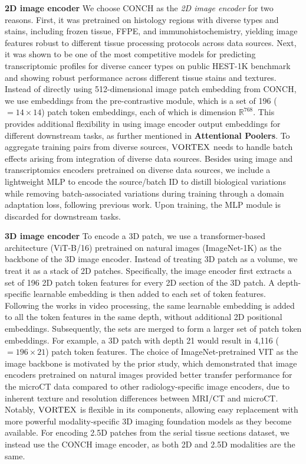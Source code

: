 \noindent\textbf{2D image encoder} We choose CONCH\cite{lu2024visual} as the \textit{2D image encoder} for two reasons. First, it was pretrained on histology regions with diverse types and stains, including frozen tissue, FFPE, and immunohistochemistry, yielding image features robust to different tissue processing protocols across data sources. Next, it was shown to be one of the most competitive models for predicting transcriptomic profiles for diverse cancer types on public HEST-1K benchmark\cite{jaume2024hest} and showing robust performance across different tissue stains and textures\cite{filiot2025distilling}. 
Instead of directly using 512-dimensional image patch embedding from CONCH, we use embeddings from the pre-contrastive module, which is a set of 196 ($= 14 \times 14$) patch token embeddings, each of which is dimension $\mathbb{R}^{768}$. This provides additional flexibility in using image encoder output embeddings for different downstream tasks, as further mentioned in \textbf{Attentional Poolers}.
To aggregate training pairs from diverse sources, $\textsc{VORTEX}$ needs to handle batch effects arising from integration of diverse data sources. Besides using image and transcriptomics encoders pretrained on diverse data sources, we include a lightweight MLP to encode the source/batch ID to distill biological variations while removing batch-associated variations during training through a domain adaptation loss, following previous work\cite{ganin2015unsupervised, vaidya2024demographic, cui2024scgpt}. Upon training, the MLP module is discarded for downstream tasks. 

\noindent\textbf{3D image encoder} To encode a 3D patch, we use a transformer-based architecture (ViT-B/16) pretrained on natural images (ImageNet-1K) as the backbone of the 3D image encoder. Instead of treating 3D patch as a volume, we treat it as a stack of 2D patches. Specifically, the image encoder first extracts a set of 196 2D patch token features for every 2D section of the 3D patch. A depth-specific learnable embedding is then added to each set of token features. Following the works in video processing\cite{alayrac2022flamingo}, the same learnable embedding is added to all the token features in the same depth, without additional 2D positional embeddings. Subsequently, the sets are merged to form a larger set of patch token embeddings\cite{alayrac2022flamingo}. For example, a 3D patch with depth 21 would result in 4,116 ($=196\times 21$) patch token features. The choice of ImageNet-pretrained VIT as the image backbone is motivated by the prior study\cite{song2024analysis}, which demonstrated that image encoders pretrained on natural images provided better transfer performance for the microCT data compared to other radiology-specific image encoders, due to inherent texture and resolution differences between MRI/CT and microCT. Notably, $\textsc{VORTEX}$ is flexible in its components, allowing easy replacement with more powerful modality-specific 3D imaging foundation models as they become available. For encoding 2.5D patches from the serial tissue sections dataset, we instead use the CONCH image encoder, as both 2D and 2.5D modalities are the same. 

